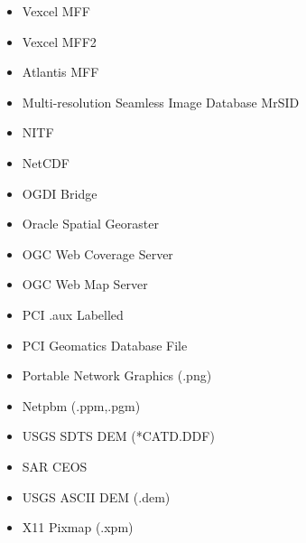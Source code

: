 \begin{itemize}
\item Vexcel MFF
\item Vexcel MFF2
\item Atlantis MFF
\item Multi-resolution Seamless Image Database  MrSID
\item NITF
\item NetCDF
\item OGDI Bridge
\item Oracle Spatial Georaster
\item OGC Web Coverage Server
\item OGC Web Map Server
\item PCI .aux Labelled
\item PCI Geomatics Database File
\item Portable Network Graphics (.png)
\item Netpbm (.ppm,.pgm)
\item USGS SDTS DEM (*CATD.DDF)
\item SAR CEOS
\item USGS ASCII DEM (.dem)
\item X11 Pixmap (.xpm)

\end{itemize}
\clearpage
